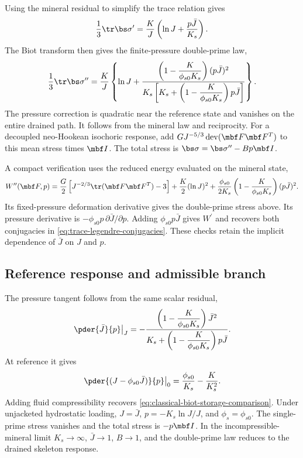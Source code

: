 Using the mineral residual to simplify the trace relation gives
\begin{equation}
 \frac13\tr\bs\sigma^{\prime}
 =\frac{K}{J}\left(\ln J+\frac{p\bar J}{K_s}\right).
 \label{eq:trace-closed-form-single-prime-stress}
\end{equation}
The Biot transform then gives the finite-pressure double-prime law,
\begin{equation}
 \frac13\tr\bs\sigma^{\prime\prime}
 =\frac{K}{J}\left\{
 \ln J+
 \frac{\left(1-\dfrac{K}{\phi_{s0}K_s}\right)(p\bar J)^2}
 {K_s\left[K_s+\left(1-\dfrac{K}{\phi_{s0}K_s}\right)p\bar J\right]}
 \right\}.
 \label{eq:trace-closed-form-double-prime-stress}
\end{equation}
The pressure correction is quadratic near the reference state and vanishes
on the entire drained path.  It follows from the mineral law and reciprocity.
For a decoupled neo-Hookean isochoric response, add
\(GJ^{-5/3}\operatorname{dev}(\mbf F\mbf F^T)\) to this mean stress times
\(\mbf I\).  The total stress is
\(\bs\sigma=\bs\sigma^{\prime\prime}-Bp\mbf I\).

A compact verification uses the reduced energy evaluated on the mineral state,
\begin{equation}
 W^{\prime\prime}(\mbf F,p)
 =\frac{G}{2}\left[J^{-2/3}\tr(\mbf F\mbf F^T)-3\right]
 +\frac{K}{2}(\ln J)^2
 +\frac{\phi_{s0}}{2K_s}
 \left(1-\frac{K}{\phi_{s0}K_s}\right)(p\bar J)^2.
 \label{eq:trace-compatible-reduced-potential}
\end{equation}
Its fixed-pressure deformation derivative gives the double-prime stress
above.  Its pressure derivative is
\(-\phi_{s0}p\,\partial\bar J/\partial p\).  Adding
\(\phi_{s0}p\bar J\) gives \(W^{\prime}\) and recovers both conjugacies in
\eqref{eq:trace-legendre-conjugacies}.  These checks retain the implicit
dependence of \(\bar J\) on \(J\) and \(p\).

\subsection{Reference response and admissible branch}

The pressure tangent follows from the same scalar residual,
\begin{equation}
 \left.\pder{\bar J}{p}\right|_J
 =-\frac{\left(1-\dfrac{K}{\phi_{s0}K_s}\right)\bar J^2}
 {K_s+\left(1-\dfrac{K}{\phi_{s0}K_s}\right)p\bar J}.
 \label{eq:trace-mineral-pressure-tangent}
\end{equation}
At reference it gives
\begin{equation}
 \left.\pder{(J-\phi_{s0}\bar J)}{p}\right|_0
 =\frac{\phi_{s0}}{K_s}-\frac{K}{K_s^2}.
 \label{eq:trace-reference-pore-volume-storage}
\end{equation}
Adding fluid compressibility recovers
\eqref{eq:classical-biot-storage-comparison}.
Under unjacketed hydrostatic loading, \(J=\bar J\),
\(p=-K_s\ln J/J\), and \(\phi_s=\phi_{s0}\).  The single-prime stress
vanishes and the total stress is \(-p\mbf I\).  In the incompressible-mineral
limit \(K_s\to\infty\), \(\bar J\to1\), \(B\to1\), and the
double-prime law reduces to the drained skeleton response.

